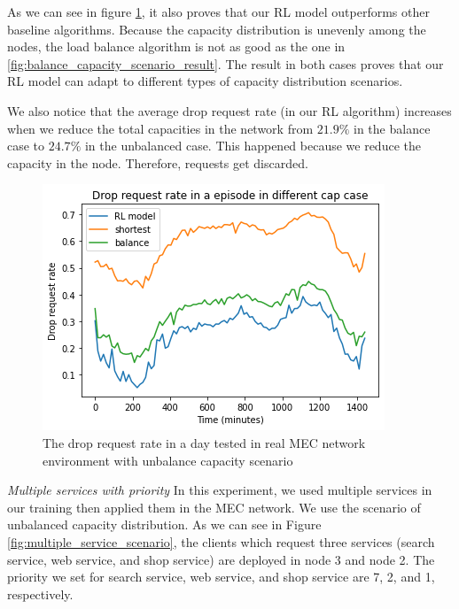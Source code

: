 \documentclass[conference]{IEEEtran}
\begin{document}
As we can see in figure \ref{fig:unbalance_capacity_results}, it also proves that our RL model outperforms other baseline algorithms. Because the capacity distribution is unevenly among the nodes, the load balance algorithm is not as good as the one in \ref{fig:balance_capacity_scenario_result}. The result in both cases proves that our RL model can adapt to different types of capacity distribution scenarios.

We also notice that the average drop request rate (in our RL algorithm) increases when we reduce the total capacities in the network from $21.9\%$ in the balance case to $24.7\%$ in the unbalanced case. This happened because we reduce the capacity in the node. Therefore, requests get discarded.

\begin{figure}[]
    \centering
    \includegraphics[scale = 0.5]{imgs/unbalance_capacity_results.png}
    \caption{The drop request rate in a day tested in real MEC network environment with unbalance capacity scenario}
    \label{fig:unbalance_capacity_results}
\end{figure}

\textit{Multiple services with priority}
In this experiment, we used multiple services in our training then applied them in the MEC network. We use the scenario of unbalanced capacity distribution. As we can see in Figure \ref{fig:multiple_service_scenario}, the clients which request three services (search service, web service, and shop service) are deployed in node 3 and node 2. The priority we set for search service, web service, and shop service are 7, 2, and 1, respectively. 
\end{document}

